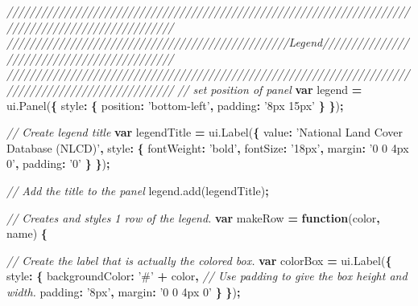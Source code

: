 \documentclass[]{article}
\newenvironment{Shaded}{\begin{snugshade}}{\end{snugshade}}
\newcommand{\KeywordTok}[1]{\textcolor[rgb]{0.13,0.29,0.53}{\textbf{#1}}}
\newcommand{\DataTypeTok}[1]{\textcolor[rgb]{0.13,0.29,0.53}{#1}}
\newcommand{\StringTok}[1]{\textcolor[rgb]{0.31,0.60,0.02}{#1}}
\newcommand{\CommentTok}[1]{\textcolor[rgb]{0.56,0.35,0.01}{\textit{#1}}}
\newcommand{\VariableTok}[1]{\textcolor[rgb]{0.00,0.00,0.00}{#1}}
\newcommand{\OperatorTok}[1]{\textcolor[rgb]{0.81,0.36,0.00}{\textbf{#1}}}
\newcommand{\AttributeTok}[1]{\textcolor[rgb]{0.77,0.63,0.00}{#1}}
\newcommand{\NormalTok}[1]{#1}
\begin{document}
\begin{Shaded}
\begin{Highlighting}[]
\CommentTok{///////////////////////////////////////////////////////////////////////////////////////////////////}
\CommentTok{/////////////////////////////////////////////////Legend////////////////////////////////////////////}
\CommentTok{///////////////////////////////////////////////////////////////////////////////////////////////////}
\CommentTok{// set position of panel}
\KeywordTok{var}\NormalTok{ legend }\OperatorTok{=} \VariableTok{ui}\NormalTok{.}\AttributeTok{Panel}\NormalTok{(}\OperatorTok{\{}
  \DataTypeTok{style}\OperatorTok{:} \OperatorTok{\{}
    \DataTypeTok{position}\OperatorTok{:} \StringTok{'bottom-left'}\OperatorTok{,}
    \DataTypeTok{padding}\OperatorTok{:} \StringTok{'8px 15px'}
  \OperatorTok{\}}
\OperatorTok{\}}\NormalTok{)}\OperatorTok{;}

\CommentTok{// Create legend title}
\KeywordTok{var}\NormalTok{ legendTitle }\OperatorTok{=} \VariableTok{ui}\NormalTok{.}\AttributeTok{Label}\NormalTok{(}\OperatorTok{\{}
  \DataTypeTok{value}\OperatorTok{:} \StringTok{'National Land Cover Database (NLCD)'}\OperatorTok{,}
  \DataTypeTok{style}\OperatorTok{:} \OperatorTok{\{}
    \DataTypeTok{fontWeight}\OperatorTok{:} \StringTok{'bold'}\OperatorTok{,}
    \DataTypeTok{fontSize}\OperatorTok{:} \StringTok{'18px'}\OperatorTok{,}
    \DataTypeTok{margin}\OperatorTok{:} \StringTok{'0 0 4px 0'}\OperatorTok{,}
    \DataTypeTok{padding}\OperatorTok{:} \StringTok{'0'}
    \OperatorTok{\}}
\OperatorTok{\}}\NormalTok{)}\OperatorTok{;}

\CommentTok{// Add the title to the panel}
\VariableTok{legend}\NormalTok{.}\AttributeTok{add}\NormalTok{(legendTitle)}\OperatorTok{;}
    
\CommentTok{// Creates and styles 1 row of the legend.}
\KeywordTok{var}\NormalTok{ makeRow }\OperatorTok{=} \KeywordTok{function}\NormalTok{(color}\OperatorTok{,}\NormalTok{ name) }\OperatorTok{\{}
      
      \CommentTok{// Create the label that is actually the colored box.}
      \KeywordTok{var}\NormalTok{ colorBox }\OperatorTok{=} \VariableTok{ui}\NormalTok{.}\AttributeTok{Label}\NormalTok{(}\OperatorTok{\{}
        \DataTypeTok{style}\OperatorTok{:} \OperatorTok{\{}
          \DataTypeTok{backgroundColor}\OperatorTok{:} \StringTok{'#'} \OperatorTok{+}\NormalTok{ color}\OperatorTok{,}
          \CommentTok{// Use padding to give the box height and width.}
          \DataTypeTok{padding}\OperatorTok{:} \StringTok{'8px'}\OperatorTok{,}
          \DataTypeTok{margin}\OperatorTok{:} \StringTok{'0 0 4px 0'}
        \OperatorTok{\}}
      \OperatorTok{\}}\NormalTok{)}\OperatorTok{;}
      

\end{Highlighting}
\end{Shaded}
\end{document}
